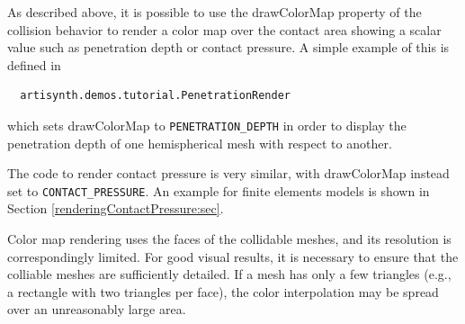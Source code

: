 As described above, it is possible to use the {\sf drawColorMap}
property of the collision behavior to render a color map over the
contact area showing a scalar value such as penetration depth or
contact pressure. A simple example of this is defined in
%
\begin{verbatim}
  artisynth.demos.tutorial.PenetrationRender
\end{verbatim}
%
which sets {\sf drawColorMap} to {\tt PENETRATION\_DEPTH} in order to
display the penetration depth of one hemispherical mesh with respect
to another. 

\begin{sideblock}
The code to render contact pressure is very similar, with {\sf
drawColorMap} instead set to {\tt CONTACT\_PRESSURE}.  An example for
finite elements models is shown in Section
\ref{renderingContactPressure:sec}.
\end{sideblock}

\begin{sideblock}
Color map rendering uses the faces of the collidable meshes, and its
resolution is correspondingly limited. For good visual results, it is
necessary to ensure that the colliable meshes are sufficiently
detailed.  If a mesh has only a few triangles (e.g., a rectangle with
two triangles per face), the color interpolation may be spread over an
unreasonably large area.
\end{sideblock}

